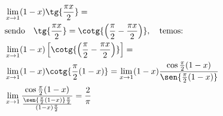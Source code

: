 \begin{ex}
\begin{align}
&\lim_{x\rightarrow 1} (1-x)\tg{\frac{\pi x}{2}}=\nonumber\\
&\text{sendo}\quad \tg{\frac{\pi x}{2}}=\cotg{\left(\frac{\pi}{2}-\frac{\pi x}{2}\right)}, \quad \text{temos:}\nonumber\\
&\lim_{x\rightarrow 1} (1-x)\left[\cotg{\left(\frac{\pi}{2}-\frac{\pi x}{2}\right)}\right]=\nonumber\\
&\lim_{x\rightarrow 1} (1-x) \cotg{\frac{\pi}{2}(1-x)}=\lim_{x\rightarrow 1} (1-x) \frac{\cos{\frac{\pi}{2}(1-x)}}{\sen{\frac{\pi}{2}(1-x)}}\nonumber\\
&\lim_{x\rightarrow 1} \frac{\cos{\frac{\pi}{2}(1-x)}}{\frac{\sen{\frac{\pi}{2}(1-x)}\frac{\pi}{2}}{(1-x)\frac{\pi}{2}}}=\frac{2}{\pi}\nonumber
\end{align}
\end{ex}